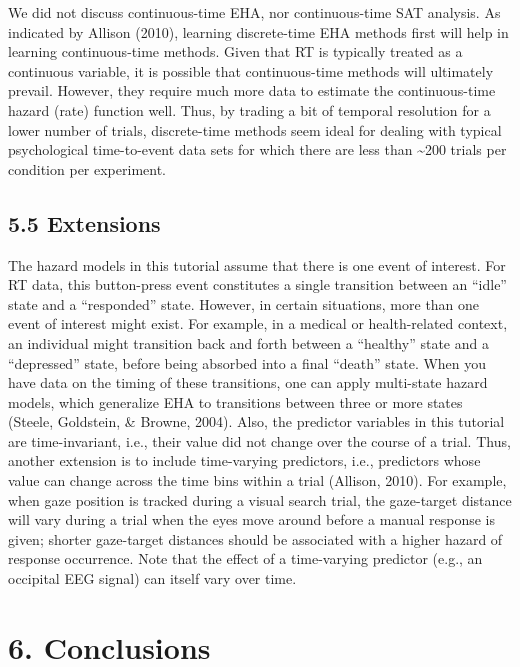 \documentclass[
  man, donotrepeattitle,floatsintext]{apa6}
\begin{document}
We did not discuss continuous-time EHA, nor continuous-time SAT analysis. As indicated by Allison (2010), learning discrete-time EHA methods first will help in learning continuous-time methods. Given that RT is typically treated as a continuous variable, it is possible that continuous-time methods will ultimately prevail. However, they require much more data to estimate the continuous-time hazard (rate) function well. Thus, by trading a bit of temporal resolution for a lower number of trials, discrete-time methods seem ideal for dealing with typical psychological time-to-event data sets for which there are less than \textasciitilde200 trials per condition per experiment.

\subsection{5.5 Extensions}\label{extensions}

The hazard models in this tutorial assume that there is one event of interest. For RT data, this button-press event constitutes a single transition between an ``idle'' state and a ``responded'' state. However, in certain situations, more than one event of interest might exist. For example, in a medical or health-related context, an individual might transition back and forth between a ``healthy'' state and a ``depressed'' state, before being absorbed into a final ``death'' state. When you have data on the timing of these transitions, one can apply multi-state hazard models, which generalize EHA to transitions between three or more states (Steele, Goldstein, \& Browne, 2004).
Also, the predictor variables in this tutorial are time-invariant, i.e., their value did not change over the course of a trial. Thus, another extension is to include time-varying predictors, i.e., predictors whose value can change across the time bins within a trial (Allison, 2010). For example, when gaze position is tracked during a visual search trial, the gaze-target distance will vary during a trial when the eyes move around before a manual response is given; shorter gaze-target distances should be associated with a higher hazard of response occurrence. Note that the effect of a time-varying predictor (e.g., an occipital EEG signal) can itself vary over time.

\section{6. Conclusions}\label{conclusions}
\end{document}
